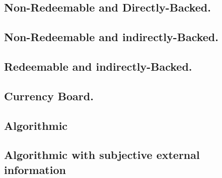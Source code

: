 \subsection{Non-Redeemable and Directly-Backed.}


\subsection{Non-Redeemable and indirectly-Backed.}


\subsection{Redeemable and indirectly-Backed.}

 \subsection{Currency Board.}

\subsection{Algorithmic}


\subsection{Algorithmic with subjective external information}

